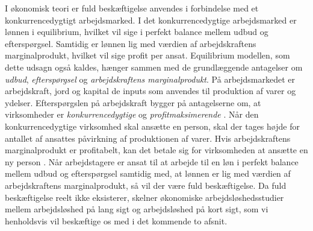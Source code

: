I økonomisk teori er fuld beskæftigelse anvendes i forbindelse med et konkurrencedygtigt arbejdsmarked. I det konkurrencedygtige arbejdsmarked er lønnen i equilibrium, hvilket vil sige i perfekt balance mellem udbud og efterspørgsel. Samtidig er lønnen lig med værdien af arbejdskraftens marginalprodukt, hvilket vil sige profit per ansat. Equilibrium modellen, som dette udsagn også kaldes, hænger sammen med de grundlæggende antagelser om \textit{udbud}, \textit{efterspørgsel} og \textit{arbejdskraftens marginalprodukt}. På arbejdsmarkedet er arbejdskraft, jord og kapital de inputs som anvendes til produktion af varer og ydelser. Efterspørgslen på arbejdskraft bygger på antagelserne om, at virksomheder er \textit{konkurrencedygtige} og \textit{profitmaksimerende} \parencite[383]{Mankiw2011}. Når den konkurrencedygtige virksomhed skal ansætte en person, skal der tages højde for antallet af ansattes påvirkning af produktionen af varer. Hvis arbejdskraftens marginalprodukt er profitabelt, kan det betale sig for virksomheden at ansætte en ny person \parencite[384]{Mankiw2011}. Når arbejdstagere er ansat til at arbejde til en løn i perfekt balance mellem udbud og efterspørgsel samtidig med, at lønnen er lig med værdien af arbejdskraftens marginalprodukt, så vil der være fuld beskæftigelse. %
Da fuld beskæftigelse reelt ikke eksisterer, skelner økonomiske arbejdsløshedsstudier mellem arbejdsløshed på lang sigt og arbejdsløshed på kort sigt, som vi henholdsvis vil beskæftige os med i det kommende to afsnit. 

